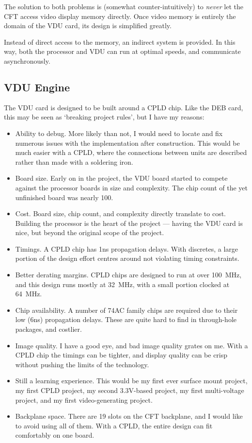 The solution to both problems is (somewhat counter-intuitively) to {\em
  never\/} let the CFT access video display memory directly. Once video memory
is entirely the domain of the VDU card, its design is simplified greatly.

Instead of direct access to the memory, an indirect system is provided. In this
way, both the processor and VDU can run at optimal speeds, and communicate
asynchronously.


\subsection{VDU Engine}

The VDU card is designed to be built around a CPLD chip. Like the DEB card,
this may be seen as ‘breaking project rules’, but I have my reasons:

\begin{itemize}
\item Ability to debug. More likely than not, I would need to locate and fix
  numerous issues with the implementation after construction. This would be
  much easier with a CPLD, where the connections between units are described
  rather than made with a soldering iron.
\item Board size. Early on in the project, the VDU board started to compete
  against the processor boards in size and complexity. The chip count of the
  yet unfinished board was nearly 100.
\item Cost. Board size, chip count, and complexity directly translate to
  cost. Building the processor is the heart of the project — having the VDU
  card is nice, but beyond the original scope of the project.
\item Timings. A CPLD chip has 1ns propagation delays. With discretes,
  a large portion of the design effort centres around not violating
  timing constraints.
\item Better derating margins. CPLD chips are designed to run at over
  100~MHz, and this design runs mostly at 32~MHz, with a small portion
  clocked at 64~MHz.
\item Chip availability. A number of 74AC family chips are required
  due to their low (6ns) propagation delays. These are quite hard to
  find in through-hole packages, and costlier.
\item Image quality. I have a good eye, and bad image quality grates on me. With a
  CPLD chip the timings can be tighter, and display quality can be crisp
  without pushing the limits of the technology.
\item Still a learning experience. This would be my first ever surface mount
  project, my first CPLD project, my second 3.3V-based project, my first
  multi-voltage project, and my first video-generating project.
\item Backplane space. There are 19 slots on the CFT backplane, and I would
  like to avoid using all of them. With a CPLD, the entire design can fit
  comfortably on one board.
\end{itemize}

